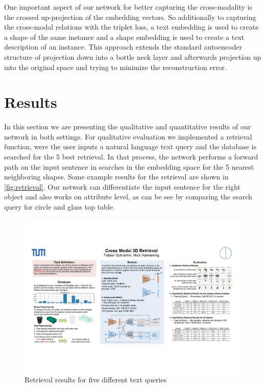 \documentclass[10pt,twocolumn,letterpaper]{article}
\begin{document}
One important aspect of our network for better capturing the cross-modality is the crossed up-projection of the embedding vectors. So additionally to capturing the cross-modal relations with the triplet loss, a text embedding is used to create a shape of the same instance and a shape embedding is used to create a text description of an instance. This approach extends the standard autoencoder structure of projection down into a bottle neck layer and afterwards projection up into the original space and trying to minimize the reconstruction error.

\section{Results}
In this section we are presenting the qualitative and quantitative results of our network in both settings. For qualitative evaluation we implemented a retrieval function, were the user inputs a natural language text query and the database is searched for the 5 best retrieval. In that process, the network performs a forward path on the input sentence in searches in the embedding space for the 5 nearest neighboring shapes. Some example results for the retrieval are shown in \autoref{fig:retrieval}. Our network can differentiate the input sentence for the right object and also works on attribute level, as can be see by comparing the search query for circle and glass top table.
\begin{figure}[ht]%
	\centering
	\includegraphics[width=1\linewidth]{fig5.pdf}
	\caption[]{Retrieval results for five different text queries}
	\label{fig:retrieval}
\end{figure}
\end{document}
